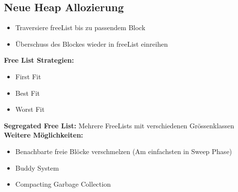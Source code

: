 \subsection{Neue Heap Allozierung}
\begin{itemize}[topsep=0pt]
    \itemsep -0.2em
    \item Traversiere freeList bis zu passendem Block
    \item Überschuss des Blockes wieder in freeList einreihen
\end{itemize}

\textbf{Free List Strategien:}
\begin{itemize}[topsep=0pt]
    \itemsep -0.2em
    \item First Fit
    \item Best Fit
    \item Worst Fit
\end{itemize}

\textbf{Segregated Free List:} Mehrere FreeLists mit verschiedenen Grössenklassen\\
\textbf{Weitere Möglichkeiten:}
\begin{itemize}[topsep=0pt]
    \itemsep -0.2em
    \item Benachbarte freie Blöcke verschmelzen (Am einfachsten in Sweep Phase)
    \item Buddy System
    \item Compacting Garbage Collection
\end{itemize}


